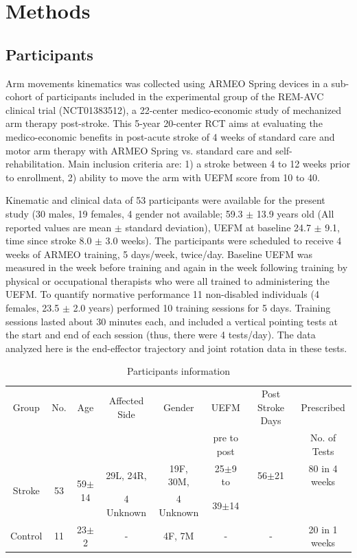 \section{Methods}

\subsection{Participants}

Arm movements kinematics was collected using ARMEO Spring devices in a sub-cohort of participants included in the experimental group of the REM-AVC clinical trial (NCT01383512), a 22-center medico-economic study of mechanized arm therapy post-stroke. 
This 5-year 20-center RCT aims at evaluating the medico-economic benefits in post-acute stroke of 4 weeks of standard care and motor arm therapy with ARMEO Spring vs. standard care and self-rehabilitation. 
Main inclusion criteria are: 1) a stroke between 4 to 12 weeks prior to enrollment, 2) ability to move the arm with UEFM score from 10 to 40. 

Kinematic and clinical data of 53 participants were available for the present study (30 males, 19 females, 4 gender not available; 59.3 $\pm$ 13.9 years old (All reported values are mean $\pm$ standard deviation), UEFM at baseline 24.7 $\pm$ 9.1, time since stroke 8.0 $\pm$ 3.0 weeks). 
The participants were scheduled to receive 4 weeks of ARMEO training, 5 days/week, twice/day. 
Baseline UEFM was measured in the week before training and again in the week following training by physical or occupational therapists who were all trained to administering the UEFM. 
To quantify normative performance 11 non-disabled individuals (4 females, 23.5 $\pm$ 2.0 years) performed 10 training sessions for 5 days. 
Training sessions lasted about 30 minutes each, and included a vertical pointing tests at the start and end of each session (thus, there were 4 tests/day). 
The data analyzed here is the end-effector trajectory and joint rotation data in these tests.

\begin{table}[b]
\footnotesize
	\begin{tabular}{|c|c|c|c|c|c|c|c|}
		\hline
		Group & No. & Age & Affected Side & Gender & UEFM & Post Stroke Days & Prescribed \\
		&&&&&  pre to post & & No. of Tests		\\
		\hline
		\multirow{2}{*}{Stroke} & \multirow{2}{*}{53} & \multirow{2}{*}{59$\pm$14} & 29L, 24R, & 19F, 30M, & 25$\pm$9 to & 56$\pm$21 & 80 in 4 weeks \\ 
		&&& 4 Unknown & 4 Unknown & 39$\pm$14 && \\
		\hline
		Control & 11 & 23$\pm$2 & - & 4F, 7M & - & - & 20 in 1 weeks \\
		\hline
	\end{tabular}
	\caption{Participants information}
	\label{tab:demog}
\end{table}

